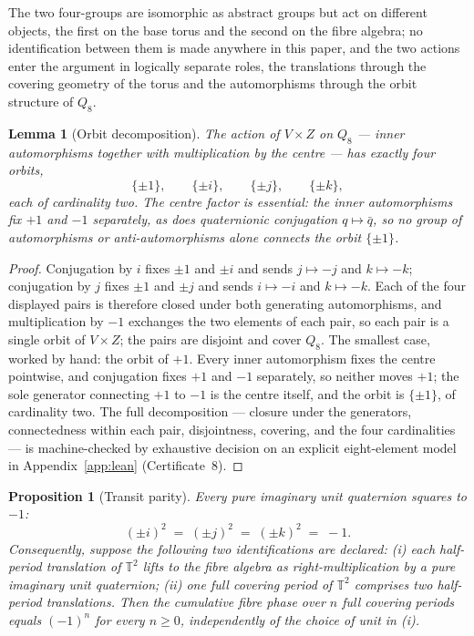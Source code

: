 \documentclass[11pt,a4paper]{article}
\newcommand{\T}{\mathbb{T}}
\theoremstyle{plain}
\newtheorem{lemma}[theorem]{Lemma}
\newtheorem{proposition}[theorem]{Proposition}
\theoremstyle{definition}
\theoremstyle{remark}
\begin{document}
The two four-groups are isomorphic as abstract groups but act on different objects, the first on the base torus and the second on the fibre algebra; no identification between them is made anywhere in this paper, and the two actions enter the argument in logically separate roles, the translations through the covering geometry of the torus and the automorphisms through the orbit structure of $Q_8$.

\begin{lemma}[Orbit decomposition]\label{lem:orbits}
The action of $V \times Z$ on $Q_8$ --- inner automorphisms together with multiplication by the centre --- has exactly four orbits,
\[
\{\pm 1\}, \qquad \{\pm i\}, \qquad \{\pm j\}, \qquad \{\pm k\},
\]
each of cardinality two. The centre factor is essential: the inner automorphisms fix $+1$ and $-1$ separately, as does quaternionic conjugation $q \mapsto \bar q$, so no group of automorphisms or anti-automorphisms alone connects the orbit $\{\pm 1\}$.
\end{lemma}

\begin{proof}
Conjugation by $i$ fixes $\pm 1$ and $\pm i$ and sends $j \mapsto -j$ and $k \mapsto -k$; conjugation by $j$ fixes $\pm 1$ and $\pm j$ and sends $i \mapsto -i$ and $k \mapsto -k$. Each of the four displayed pairs is therefore closed under both generating automorphisms, and multiplication by $-1$ exchanges the two elements of each pair, so each pair is a single orbit of $V \times Z$; the pairs are disjoint and cover $Q_8$. The smallest case, worked by hand: the orbit of $+1$. Every inner automorphism fixes the centre pointwise, and conjugation fixes $+1$ and $-1$ separately, so neither moves $+1$; the sole generator connecting $+1$ to $-1$ is the centre itself, and the orbit is $\{\pm 1\}$, of cardinality two. The full decomposition --- closure under the generators, connectedness within each pair, disjointness, covering, and the four cardinalities --- is machine-checked by exhaustive decision on an explicit eight-element model in Appendix~\ref{app:lean} (Certificate~8).
\end{proof}

\begin{proposition}[Transit parity]\label{prop:parity}
Every pure imaginary unit quaternion squares to $-1$:
\[
(\pm i)^2 \;=\; (\pm j)^2 \;=\; (\pm k)^2 \;=\; -1 .
\]
Consequently, suppose the following two identifications are declared: \textup{(i)} each half-period translation of $\T^2$ lifts to the fibre algebra as right-multiplication by a pure imaginary unit quaternion; \textup{(ii)} one full covering period of $\T^2$ comprises two half-period translations. Then the cumulative fibre phase over $n$ full covering periods equals $(-1)^n$ for every $n \ge 0$, independently of the choice of unit in \textup{(i)}.
\end{proposition}
\end{document}
